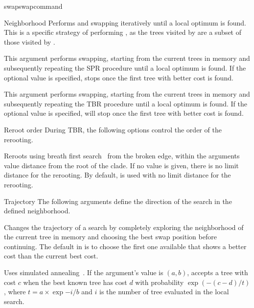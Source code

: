 \begin{command}{swap}{swapcommand}
\begin{arguments}
\begin{argumentgroup}{Neighborhood}
{Performs  and 
swapping iteratively until a local optimum is found.
This is a specific strategy of performing ,
as the trees visited by  are a subset
of those visited by .}
{}

{This argument performs  swapping, starting
from the current trees in memory and subsequently repeating
the SPR procedure until a local optimum is found. If the optional value
 is specified,  
stops once the first tree with better cost is found.} 
{}

{This argument performs  swapping, starting
from the current trees in memory and subsequently repeating
the TBR procedure until a local optimum is found. If the optional value
 is specified,  
will stop once the first tree with better cost is found.}
{}

\end{argumentgroup}

\begin{argumentgroup}{Reroot order}
{During TBR, the following options control the order of the rerooting.}

{Reroots using breath first search~\cite{cormen2001} from the broken edge, within the
arguments value distance from the root of the clade. If no value is
given, there is no limit distance for the rerooting. By default, 
is used with no limit distance for the rerooting.}
{}

\end{argumentgroup}


\begin{argumentgroup}{Trajectory}
{The following arguments define the direction of the search in the defined
neighborhood.}

{Changes the trajectory of a search by
completely exploring the neighborhood of the current
tree in memory and choosing the best swap position
before continuing.
The default in \poy is to choose the first one
available that shows a better cost than the current
best cost.}
{}

{Uses simulated annealing~\cite{Kirkpatrick1983}. If the argument's value is $(a, b)$, 
\poy accepts a tree with cost $c$ when the best known tree has
cost $d$ with probability $\exp{(- (c - d) / t)}$, where
$t = a \times \exp{- i / b}$ and $i$ is the number of tree
evaluated in the local search.}
{}


\end{argumentgroup}
\end{arguments}
\end{command}

